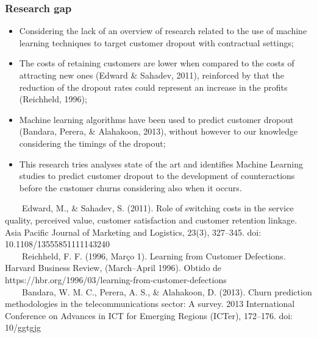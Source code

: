 \documentclass[10pt]{beamer}
\begin{document}
\begin{frame}
	\frametitle{Research gap}
	\Large
		\begin{itemize} \normalsize
			\item Considering the lack of an overview of research related to the use of machine learning techniques to target customer dropout with contractual settings;	
			\item The costs of retaining customers are lower when compared to the costs of attracting new ones \footnotesize(Edward \& Sahadev, 2011)\normalsize, reinforced by that the reduction of the dropout rates could represent an increase in the profits \footnotesize(Reichheld, 1996)\normalsize;
			\item Machine learning algorithms have been used to predict customer dropout \footnotesize(Bandara, Perera, \& Alahakoon, 2013)\normalsize, without however to our knowledge considering the timings of the dropout;
			\item This research tries  analyses state of the art and identifies Machine Learning studies to predict customer dropout to the development of counteractions before the customer churns considering also when it occurs.
		\end{itemize}	
	\tiny
	~~~~Edward, M., \& Sahadev, S. (2011). Role of switching costs in the service quality, perceived value, customer satisfaction and customer retention linkage. Asia Pacific Journal of Marketing and Logistics, 23(3), 327–345. doi: 10.1108/13555851111143240 \\
	~~~~Reichheld, F. F. (1996, Março 1). Learning from Customer Defections. Harvard Business Review, (March–April 1996). Obtido de https://hbr.org/1996/03/learning-from-customer-defections \\
	~~~~Bandara, W. M. C., Perera, A. S., \& Alahakoon, D. (2013). Churn prediction methodologies in the telecommunications sector: A survey. 2013 International Conference on Advances in ICT for Emerging Regions (ICTer), 172–176. doi: 10/ggtgjg\\
\end{frame}

\end{document}
